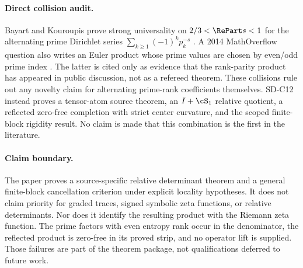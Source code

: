 \paragraph{Direct collision audit.}
Bayart and Kouroupis prove strong universality on
$2/3<\RePart s<1$ for the alternating prime Dirichlet series
$\sum_{k\ge1}(-1)^kp_k^{-s}$ \citep{bayartkouroupis2024}.  A 2014
MathOverflow question also writes an Euler product whose prime values are
chosen by even/odd prime index \citep{agno2014mathoverflow}.  The latter
is cited only as evidence that the rank-parity product has appeared in public
discussion, not as a refereed theorem.  These collisions rule out any novelty
claim for alternating prime-rank coefficients themselves.  SD-C12 instead
proves a tensor-atom source theorem, an $I+\cS_1$ relative quotient, a
reflected zero-free completion with strict center curvature, and the scoped
finite-block rigidity result.  No claim is made that this combination is the
first in the literature.

\paragraph{Claim boundary.}
The paper proves a source-specific relative determinant theorem and a general
finite-block cancellation criterion under explicit locality hypotheses.  It
does not claim priority for graded traces, signed symbolic zeta functions, or
relative determinants.  Nor does it identify the resulting product with the
Riemann zeta function.  The prime factors with even entropy rank occur in the
denominator, the reflected product is zero-free in its proved strip, and no
operator lift is supplied.  Those failures are part of the theorem package,
not qualifications deferred to future work.
